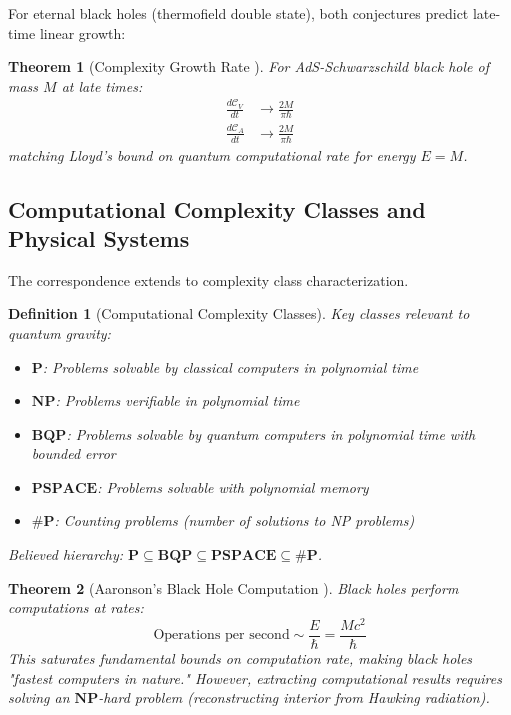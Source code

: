 \documentclass[11pt,a4paper]{article}
\newtheorem{theorem}{Theorem}[section]
\newtheorem{definition}{Definition}[section]
\theoremstyle{remark}
\theoremstyle{definition}
\begin{document}
For eternal black holes (thermofield double state), both conjectures predict late-time linear growth:

\begin{theorem}[Complexity Growth Rate \cite{Brown2016}]
For AdS-Schwarzschild black hole of mass $M$ at late times:
\begin{align}
\frac{d\mathcal{C}_V}{dt} &\to \frac{2M}{\pi \hbar} \\
\frac{d\mathcal{C}_A}{dt} &\to \frac{2M}{\pi \hbar}
\end{align}
matching Lloyd's bound on quantum computational rate for energy $E = M$.
\end{theorem}

\subsection{Computational Complexity Classes and Physical Systems}

The correspondence extends to complexity class characterization.

\begin{definition}[Computational Complexity Classes]
Key classes relevant to quantum gravity:
\begin{itemize}
\item $\mathbf{P}$: Problems solvable by classical computers in polynomial time
\item $\mathbf{NP}$: Problems verifiable in polynomial time
\item $\mathbf{BQP}$: Problems solvable by quantum computers in polynomial time with bounded error
\item $\mathbf{PSPACE}$: Problems solvable with polynomial memory
\item $\mathbf{\# P}$: Counting problems (number of solutions to NP problems)
\end{itemize}
Believed hierarchy: $\mathbf{P} \subseteq \mathbf{BQP} \subseteq \mathbf{PSPACE} \subseteq \mathbf{\# P}$.
\end{definition}

\begin{theorem}[Aaronson's Black Hole Computation \cite{Aaronson2016}]
Black holes perform computations at rates:
\begin{equation}
\text{Operations per second} \sim \frac{E}{\hbar} = \frac{Mc^2}{\hbar}
\end{equation}
This saturates fundamental bounds on computation rate, making black holes "fastest computers in nature." However, extracting computational results requires solving an $\mathbf{NP}$-hard problem (reconstructing interior from Hawking radiation).
\end{theorem}
\end{document}
